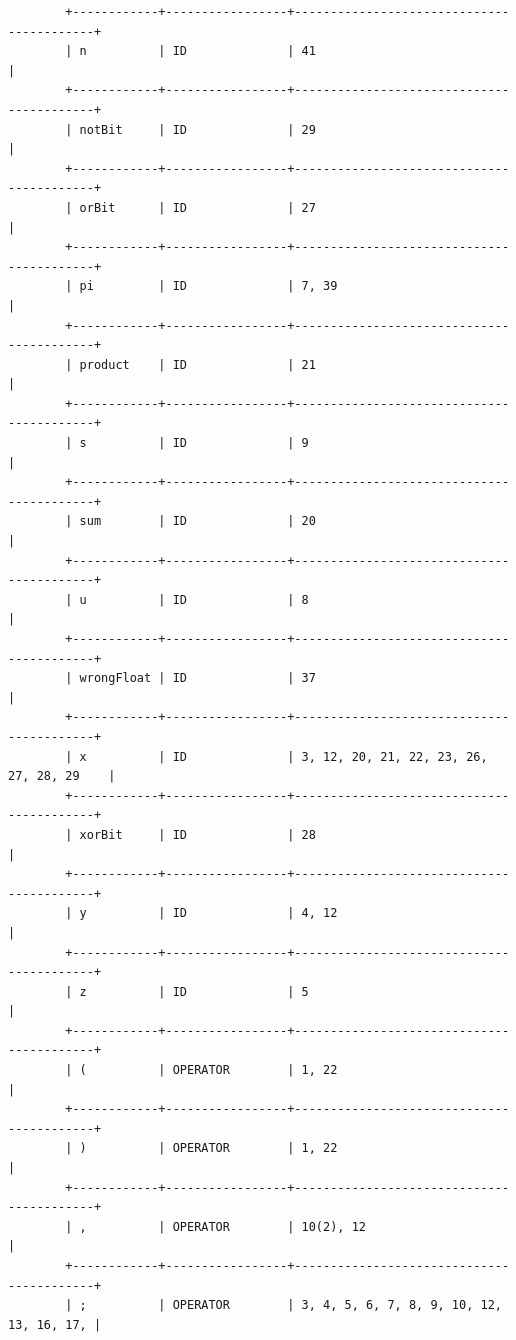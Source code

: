 \documentclass[a4paper,12pt]{article}
\begin{document}
\begin{flushleft}
\begin{verbatim}
		+------------+-----------------+------------------------------------------+
		| n          | ID              | 41                                       |
		+------------+-----------------+------------------------------------------+
		| notBit     | ID              | 29                                       |
		+------------+-----------------+------------------------------------------+
		| orBit      | ID              | 27                                       |
		+------------+-----------------+------------------------------------------+
		| pi         | ID              | 7, 39                                    |
		+------------+-----------------+------------------------------------------+
		| product    | ID              | 21                                       |
		+------------+-----------------+------------------------------------------+
		| s          | ID              | 9                                        |
		+------------+-----------------+------------------------------------------+
		| sum        | ID              | 20                                       |
		+------------+-----------------+------------------------------------------+
		| u          | ID              | 8                                        |
		+------------+-----------------+------------------------------------------+
		| wrongFloat | ID              | 37                                       |
		+------------+-----------------+------------------------------------------+
		| x          | ID              | 3, 12, 20, 21, 22, 23, 26, 27, 28, 29    |
		+------------+-----------------+------------------------------------------+
		| xorBit     | ID              | 28                                       |
		+------------+-----------------+------------------------------------------+
		| y          | ID              | 4, 12                                    |
		+------------+-----------------+------------------------------------------+
		| z          | ID              | 5                                        |
		+------------+-----------------+------------------------------------------+
		| (          | OPERATOR        | 1, 22                                    |
		+------------+-----------------+------------------------------------------+
		| )          | OPERATOR        | 1, 22                                    |
		+------------+-----------------+------------------------------------------+
		| ,          | OPERATOR        | 10(2), 12                                |
		+------------+-----------------+------------------------------------------+
		| ;          | OPERATOR        | 3, 4, 5, 6, 7, 8, 9, 10, 12, 13, 16, 17, |

\end{verbatim}
\end{flushleft}
\end{document}
